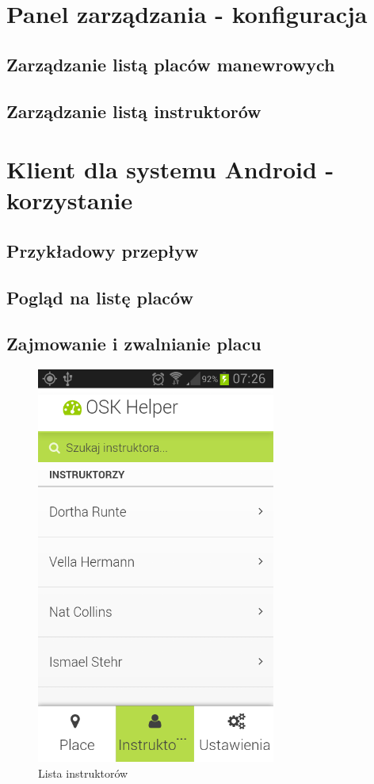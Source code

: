 \documentclass[twoside,a4paper,openright,12pt]{book}
\begin{document}
\chapter{Panel zarządzania - konfiguracja}
\section{Zarządzanie listą placów manewrowych}
\section{Zarządzanie listą instruktorów}


\chapter{Klient dla systemu Android - korzystanie}

\section{Przykładowy przepływ }
\section{Pogląd na listę placów}
\section{Zajmowanie i zwalnianie placu}


\begin{figure}[htbp]
\centering
\includegraphics[width=0.7\textwidth]{screenshots/android/lista_instruktorow.png}
\caption{Lista instruktorów}
\end{figure}
\end{document}
